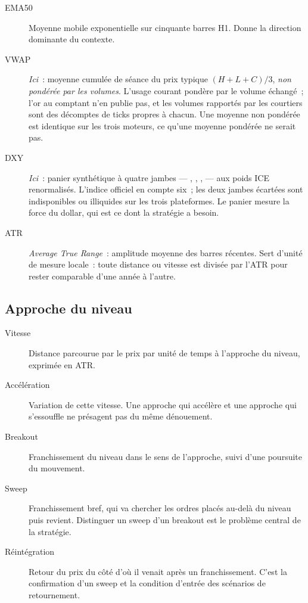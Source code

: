 \begin{description}
  \item[EMA50] Moyenne mobile exponentielle sur cinquante barres H1. Donne la
  direction dominante du contexte.
  \item[VWAP] \emph{Ici}~: moyenne cumulée de séance du prix typique
  $(H+L+C)/3$, \emph{non pondérée par les volumes}. L'usage courant pondère par
  le volume échangé~; l'or au comptant n'en publie pas, et les volumes
  rapportés par les courtiers sont des décomptes de ticks propres à chacun.
  Une moyenne non pondérée est identique sur les trois moteurs, ce qu'une
  moyenne pondérée ne serait pas.
  \item[DXY] \emph{Ici}~: panier synthétique à quatre jambes ---
  , , ,  --- aux poids ICE
  renormalisés. L'indice officiel en compte six~; les deux jambes écartées sont
  indisponibles ou illiquides sur les trois plateformes. Le panier mesure la
  force du dollar, qui est ce dont la stratégie a besoin.
  \item[ATR] \emph{Average True Range}~: amplitude moyenne des barres récentes.
  Sert d'unité de mesure locale~: toute distance ou vitesse est divisée par
  l'ATR pour rester comparable d'une année à l'autre.
\end{description}

\subsection{Approche du niveau}

\begin{description}
  \item[Vitesse] Distance parcourue par le prix par unité de temps à
  l'approche du niveau, exprimée en ATR.
  \item[Accélération] Variation de cette vitesse. Une approche qui accélère et
  une approche qui s'essouffle ne présagent pas du même dénouement.
  \item[Breakout] Franchissement du niveau dans le sens de l'approche, suivi
  d'une poursuite du mouvement.
  \item[Sweep] Franchissement bref, qui va chercher les ordres placés
  au-delà du niveau puis revient. Distinguer un sweep d'un breakout est le
  problème central de la stratégie.
  \item[Réintégration] Retour du prix du côté d'où il venait après un
  franchissement. C'est la confirmation d'un sweep et la condition d'entrée des
  scénarios de retournement.
\end{description}

